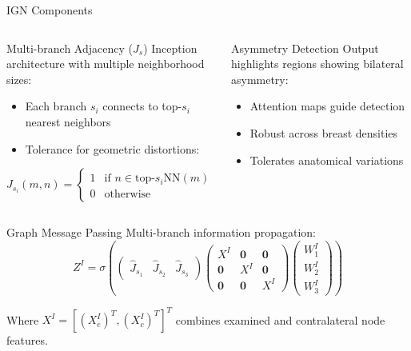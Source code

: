 \documentclass[8pt,aspectratio=169,xcolor=dvipsnames]{beamer}
\begin{document}
\begin{frame}{IGN Components}
    \begin{columns}
        \begin{block}{Multi-branch Adjacency ($J_s$)}
        Inception architecture with multiple neighborhood sizes:
        \begin{itemize}
            \item Each branch $s_i$ connects to top-$s_i$ nearest neighbors
            \item Tolerance for geometric distortions:
        \end{itemize}
        \[
        J_{s_i}(m,n) = \begin{cases}
        1 & \text{if } n \in \text{top-}s_i\text{NN}(m) \\
        0 & \text{otherwise}
        \end{cases}
        \]
        
        \end{block}
        
        
        \begin{block}{Asymmetry Detection}
        Output highlights regions showing bilateral asymmetry:
        \begin{itemize}
            \item Attention maps guide detection
            \item Robust across breast densities
            \item Tolerates anatomical variations
        \end{itemize}
        
        \end{block}
    \end{columns}
            \begin{alertblock}{Graph Message Passing}
        Multi-branch information propagation:
        \[
        Z^I = \sigma\left(
        \begin{pmatrix}
        \hat{J}_{s_1} & \hat{J}_{s_2} & \hat{J}_{s_3}
        \end{pmatrix}
        \begin{pmatrix}
        X^I & \mathbf{0} & \mathbf{0} \\
        \mathbf{0} & X^I & \mathbf{0} \\
        \mathbf{0} & \mathbf{0} & X^I
        \end{pmatrix}
        \begin{pmatrix}
        W_1^I \\
        W_2^I \\
        W_3^I
        \end{pmatrix}
        \right)
        \]
        
        Where $X^I = [(X_e^I)^T, (X_c^I)^T]^T$ combines examined and contralateral node features.
        \end{alertblock}
\end{frame}
\end{document}

